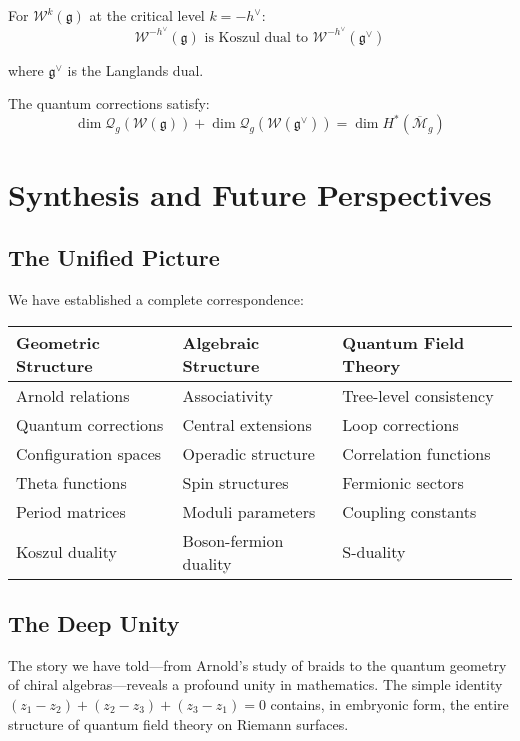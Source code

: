 For $\mathcal{W}^k(\mathfrak{g})$ at the critical level $k = -h^\vee$:
$$\mathcal{W}^{-h^\vee}(\mathfrak{g}) \text{ is Koszul dual to } \mathcal{W}^{-h^\vee}(\mathfrak{g}^\vee)$$

where $\mathfrak{g}^\vee$ is the Langlands dual.

The quantum corrections satisfy:
$$\dim \mathcal{Q}_g(\mathcal{W}(\mathfrak{g})) + \dim \mathcal{Q}_g(\mathcal{W}(\mathfrak{g}^\vee)) = \dim H^*(\overline{\mathcal{M}}_{g})$$

\section{Synthesis and Future Perspectives}

\subsection{The Unified Picture}

We have established a complete correspondence:

\begin{center}
\begin{tabular}{|l|l|l|}
\hline
\textbf{Geometric Structure} & \textbf{Algebraic Structure} & \textbf{Quantum Field Theory} \\
\hline
Arnold relations & Associativity & Tree-level consistency \\
Quantum corrections & Central extensions & Loop corrections \\
Configuration spaces & Operadic structure & Correlation functions \\
Theta functions & Spin structures & Fermionic sectors \\
Period matrices & Moduli parameters & Coupling constants \\
Koszul duality & Boson-fermion duality & S-duality \\
\hline
\end{tabular}
\end{center}

\subsection{The Deep Unity}

The story we have told—from Arnold's study of braids to the quantum geometry of chiral algebras—reveals a profound unity in mathematics. The simple identity $(z_1-z_2) + (z_2-z_3) + (z_3-z_1) = 0$ contains, in embryonic form, the entire structure of quantum field theory on Riemann surfaces.

